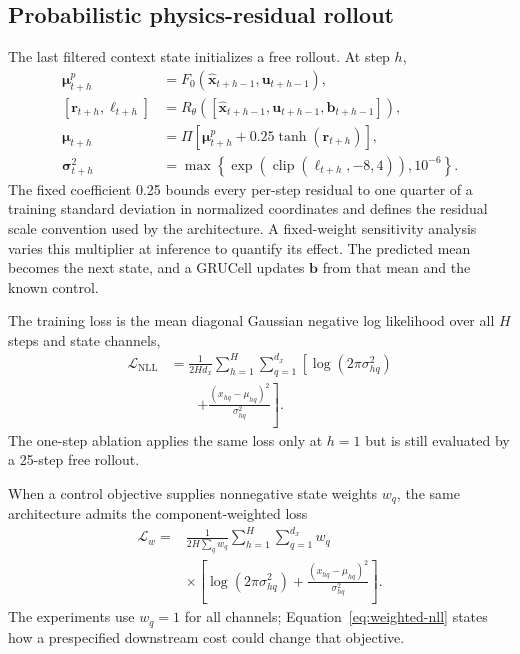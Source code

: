 \documentclass[iicol,pdflatex,sn-basic,Numbered]{sn-jnl}
\newcommand{\vect}[1]{\mathbf{#1}}
\begin{document}
\subsection{Probabilistic physics-residual rollout}

The last filtered context state initializes a free rollout. At step $h$,
\begin{align}
 \boldsymbol\mu^{p}_{t+h} &= F_0(\hat{\vect x}_{t+h-1},\vect u_{t+h-1}),\\
 [\vect r_{t+h},\vect \ell_{t+h}] &=
 R_\theta([\hat{\vect x}_{t+h-1},\vect u_{t+h-1},\vect b_{t+h-1}]),\\
 \boldsymbol\mu_{t+h} &= \Pi\!\left[
 \boldsymbol\mu^{p}_{t+h}+0.25\tanh(\vect r_{t+h})\right],\\
 \boldsymbol\sigma^2_{t+h} &=
 \max\!\left\{\exp\!\left(\operatorname{clip}(\vect\ell_{t+h},-8,4)\right),
 10^{-6}\right\}.
 \label{eq:residual-rollout}
\end{align}
The fixed coefficient 0.25 bounds every per-step residual to one quarter of a
training standard deviation in normalized coordinates and defines the residual
scale convention used by the architecture. A fixed-weight sensitivity analysis
varies this multiplier at inference to quantify its effect. The predicted mean becomes
the next state, and a GRUCell updates $\vect b$ from that mean and the known
control.

The training loss is the mean diagonal Gaussian negative log likelihood over
all $H$ steps and state channels,
\begin{equation}
\begin{aligned}
 \mathcal L_{\mathrm{NLL}}
 &=\frac{1}{2Hd_x}\sum_{h=1}^{H}\sum_{q=1}^{d_x}
 \left[\log(2\pi\sigma^2_{hq})\right.\\[-0.2em]
 &\qquad\left.+\frac{(x_{hq}-\mu_{hq})^2}{\sigma^2_{hq}}\right].
\end{aligned}
 \label{eq:nll}
\end{equation}
The one-step ablation applies the same loss only at $h=1$ but is still
evaluated by a 25-step free rollout.

When a control objective supplies nonnegative state weights $w_q$, the same
architecture admits the component-weighted loss
\begin{equation}
 \begin{aligned}
 \mathcal L_w={}&\frac{1}{2H\sum_q w_q}
 \sum_{h=1}^{H}\sum_{q=1}^{d_x}w_q \\
 &\times\left[\log(2\pi\sigma^2_{hq})+
 \frac{(x_{hq}-\mu_{hq})^2}{\sigma^2_{hq}}\right].
 \end{aligned}
 \label{eq:weighted-nll}
\end{equation}
The experiments use $w_q=1$ for all channels; Equation~\eqref{eq:weighted-nll}
states how a prespecified downstream cost could change that objective.
\end{document}
